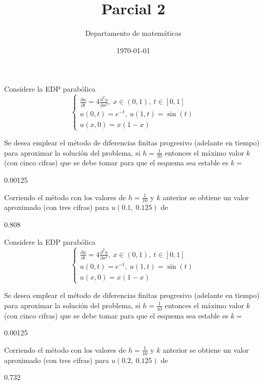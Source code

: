 \documentclass{article}
\title{Parcial 2}
\author{Departamento de matemáticas}
\date{\today}
\begin{document}
	\maketitle
	\begin{quiz}{}
    \begin{cloze}{}
    	Considere la EDP parab\'olica
    	\[\begin{cases}
    		\displaystyle\frac{\partial u}{\partial t} = 4\frac{\partial^2 u}{\partial x^2}, \ x\in(0,1), \ t\in[0,1] \\
    		u(0,t) = e^{-t}, \ u(1,t)=\sin(t) \\
    		u(x,0) = x(1-x)
    	\end{cases}\]
       \begin{numerical}[points=15]{}
       	Se desea emplear el m\'etodo de diferencias finitas progresivo  (adelante en tiempo) para aproximar la soluci\'on del problema, si $h=\frac{1}{10}$ entonces el m\'aximo valor $k$ (con cinco cifras) que se debe tomar para que el esquema sea estable es $k=$\item 0.00125
       	\end{numerical}
        \begin{numerical}[points=18]{}
        	Corriendo el m\'etodo con los valores de $h=\frac{1}{10}$ y $k$ anterior se obtiene un valor aproximado (con tres cifras) para $u(0.1,\ 0.125)$ de \item[tolerance=0.003] 0.808
        \end{numerical}
    \end{cloze}
    \begin{cloze}{}
	Considere la EDP parab\'olica
	\[\begin{cases}
		\displaystyle\frac{\partial u}{\partial t} = 4\frac{\partial^2 u}{\partial x^2}, \ x\in(0,1), \ t\in[0,1] \\
		u(0,t) = e^{-t}, \ u(1,t)=\sin(t) \\
		u(x,0) = x(1-x)
	\end{cases}\]
	\begin{numerical}[points=15]{}
		Se desea emplear el m\'etodo de diferencias finitas progresivo  (adelante en tiempo) para aproximar la soluci\'on del problema, si $h=\frac{1}{10}$ entonces el m\'aximo valor $k$ (con cinco cifras) que se debe tomar para que el esquema sea estable es $k=$\item 0.00125
	\end{numerical}
	\begin{numerical}[points=18]{}
		Corriendo el m\'etodo con los valores de $h=\frac{1}{10}$ y $k$ anterior se obtiene un valor aproximado (con tres cifras) para $u(0.2,\ 0.125)$ de \item[tolerance=0.003] 0.732

\end{numerical}
\end{cloze}
\end{quiz}
\end{document}

